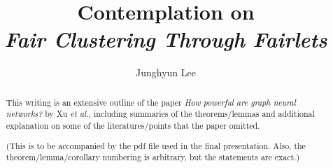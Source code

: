\documentclass[a4paper, twoside]{report}
\title{Contemplation on \\
{\it Fair Clustering Through Fairlets}}
\author{Junghyun Lee}
\theoremstyle{break}
\begin{document}


\begin{abstract}
This writing is an extensive outline of the paper {\it How powerful are graph neural networks?} by Xu {\it et al.}, including summaries of the theorems/lemmas and additional explanation on some of the literatures/points that the paper omitted.

(This is to be accompanied by the pdf file used in the final presentation. Also, the theorem/lemma/corollary numbering is arbitrary, but the statements are exact.)
\end{abstract}

\tableofcontents
\listoffigures






%



\printbibliography
%
%
\end{document}
